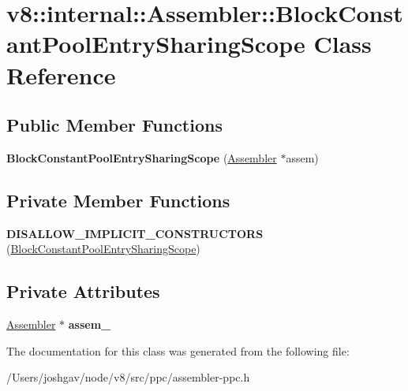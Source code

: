 \hypertarget{classv8_1_1internal_1_1_assembler_1_1_block_constant_pool_entry_sharing_scope}{}\section{v8\+:\+:internal\+:\+:Assembler\+:\+:Block\+Constant\+Pool\+Entry\+Sharing\+Scope Class Reference}
\label{classv8_1_1internal_1_1_assembler_1_1_block_constant_pool_entry_sharing_scope}
\subsection*{Public Member Functions}
\begin{DoxyCompactItemize}
\item 
{\bfseries Block\+Constant\+Pool\+Entry\+Sharing\+Scope} (\hyperlink{classv8_1_1internal_1_1_assembler}{Assembler} $\ast$assem)\hypertarget{classv8_1_1internal_1_1_assembler_1_1_block_constant_pool_entry_sharing_scope_a48bc151e959e33f606b516b2a73d3b50}{}\label{classv8_1_1internal_1_1_assembler_1_1_block_constant_pool_entry_sharing_scope_a48bc151e959e33f606b516b2a73d3b50}

\end{DoxyCompactItemize}
\subsection*{Private Member Functions}
\begin{DoxyCompactItemize}
\item 
{\bfseries D\+I\+S\+A\+L\+L\+O\+W\+\_\+\+I\+M\+P\+L\+I\+C\+I\+T\+\_\+\+C\+O\+N\+S\+T\+R\+U\+C\+T\+O\+RS} (\hyperlink{classv8_1_1internal_1_1_assembler_1_1_block_constant_pool_entry_sharing_scope}{Block\+Constant\+Pool\+Entry\+Sharing\+Scope})\hypertarget{classv8_1_1internal_1_1_assembler_1_1_block_constant_pool_entry_sharing_scope_a918dd4b63b188cc460662534793100b0}{}\label{classv8_1_1internal_1_1_assembler_1_1_block_constant_pool_entry_sharing_scope_a918dd4b63b188cc460662534793100b0}

\end{DoxyCompactItemize}
\subsection*{Private Attributes}
\begin{DoxyCompactItemize}
\item 
\hyperlink{classv8_1_1internal_1_1_assembler}{Assembler} $\ast$ {\bfseries assem\+\_\+}\hypertarget{classv8_1_1internal_1_1_assembler_1_1_block_constant_pool_entry_sharing_scope_ae9c4aaa8cc11935a3a8882814738d397}{}\label{classv8_1_1internal_1_1_assembler_1_1_block_constant_pool_entry_sharing_scope_ae9c4aaa8cc11935a3a8882814738d397}

\end{DoxyCompactItemize}


The documentation for this class was generated from the following file\+:\begin{DoxyCompactItemize}
\item 
/\+Users/joshgav/node/v8/src/ppc/assembler-\/ppc.\+h\end{DoxyCompactItemize}
